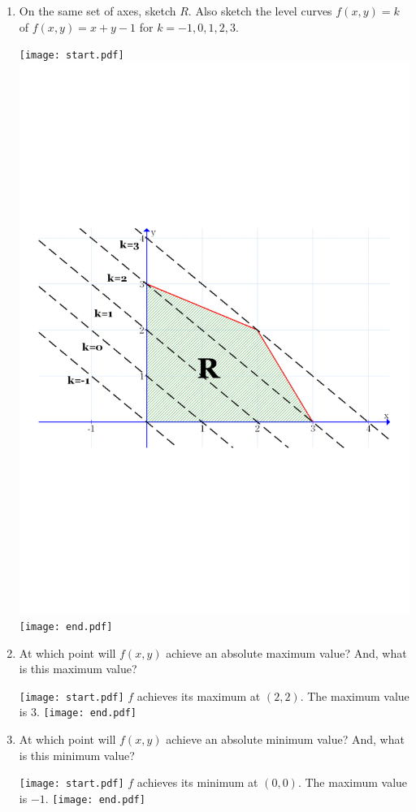 \documentclass[12pt]{article}
\begin{document}
\begin{enumerate}
\begin{enumerate}

\item On the same set of axes, sketch $R$.  Also sketch the level curves $f(x,y)=k$ of $f(x,y)=x+y-1$ for $k=-1,0,1,2,3$.

\texttt{[image: start.pdf]}
{{\includegraphics[scale=0.4]{max.pdf}}}
\texttt{[image: end.pdf]}


\item At which point will $f(x,y)$ achieve an absolute maximum value?  And, what is this maximum value?

\texttt{[image: start.pdf]}
{{$f$ achieves its maximum at $(2,2)$.  The maximum value is $3$.}}
\texttt{[image: end.pdf]}


\item At which point will $f(x,y)$ achieve an absolute minimum value?  And, what is this minimum value?

\texttt{[image: start.pdf]}
{{$f$ achieves its minimum at $(0,0)$.  The maximum value is $-1$.}}
\texttt{[image: end.pdf]}


\end{enumerate}

\end{enumerate}
\end{document}
